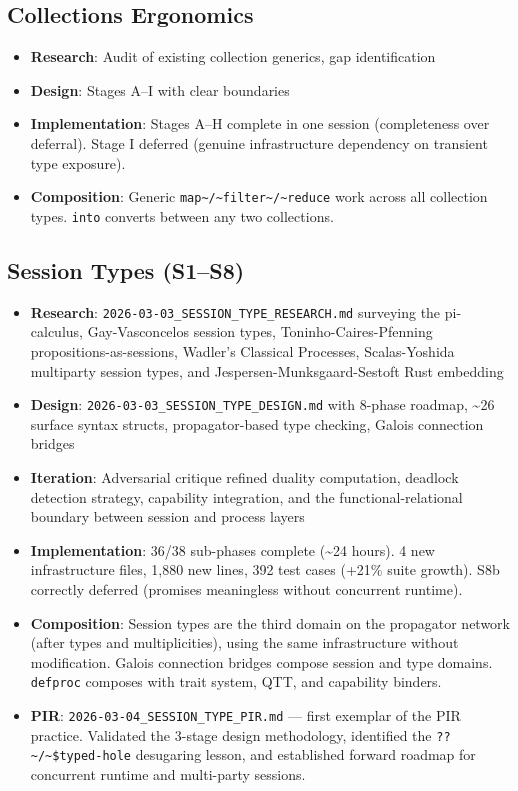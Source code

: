 \documentclass[11pt]{article}
\begin{document}
\subsection{Collections Ergonomics}
\label{sec:org02d89a4}
\begin{itemize}
\item \textbf{Research}: Audit of existing collection generics, gap identification
\item \textbf{Design}: Stages A--I with clear boundaries
\item \textbf{Implementation}: Stages A--H complete in one session (completeness
over deferral). Stage I deferred (genuine infrastructure dependency
on transient type exposure).
\item \textbf{Composition}: Generic \texttt{map\textasciitilde{}/\textasciitilde{}filter\textasciitilde{}/\textasciitilde{}reduce} work across all
collection types. \texttt{into} converts between any two collections.
\end{itemize}
\subsection{Session Types (S1--S8)}
\label{sec:org1b8f046}
\begin{itemize}
\item \textbf{Research}: \texttt{2026-03-03\_SESSION\_TYPE\_RESEARCH.md} surveying the
pi-calculus, Gay-Vasconcelos session types, Toninho-Caires-Pfenning
propositions-as-sessions, Wadler's Classical Processes, Scalas-Yoshida
multiparty session types, and Jespersen-Munksgaard-Sestoft Rust
embedding
\item \textbf{Design}: \texttt{2026-03-03\_SESSION\_TYPE\_DESIGN.md} with 8-phase roadmap,
\textasciitilde{}26 surface syntax structs, propagator-based type checking,
Galois connection bridges
\item \textbf{Iteration}: Adversarial critique refined duality computation,
deadlock detection strategy, capability integration, and the
functional-relational boundary between session and process layers
\item \textbf{Implementation}: 36/38 sub-phases complete (\textasciitilde{}24 hours). 4 new
infrastructure files, 1,880 new lines, 392 test cases (+21\% suite
growth). S8b correctly deferred (promises meaningless without
concurrent runtime).
\item \textbf{Composition}: Session types are the third domain on the propagator
network (after types and multiplicities), using the same
infrastructure without modification. Galois connection bridges
compose session and type domains. \texttt{defproc} composes with trait
system, QTT, and capability binders.
\item \textbf{PIR}: \texttt{2026-03-04\_SESSION\_TYPE\_PIR.md} --- first exemplar of the
PIR practice. Validated the 3-stage design methodology, identified
the \texttt{??\textasciitilde{}/\textasciitilde{}\$typed-hole} desugaring lesson, and established forward
roadmap for concurrent runtime and multi-party sessions.
\end{itemize}
\end{document}

